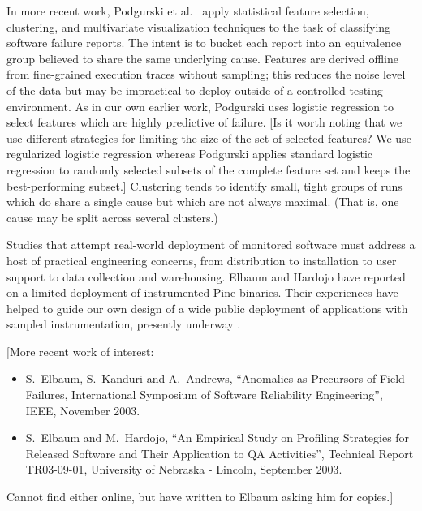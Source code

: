 \documentclass{acm_proc_article-sp}
\newcommand{\placeholder}[1]{{\color[cmyk]{0,0.61,0.87,0}[#1]}}
\begin{document}
In more recent work, Podgurski et al.\ \cite{ICSE`03*465} apply
statistical feature selection, clustering, and multivariate
visualization techniques to the task of classifying software failure
reports.  The intent is to bucket each report into an equivalence
group believed to share the same underlying cause.  Features are
derived offline from fine-grained execution traces without sampling;
this reduces the noise level of the data but may be impractical to
deploy outside of a controlled testing environment.  As in our own
earlier work, Podgurski uses logistic regression to select features
which are highly predictive of failure.  \placeholder{Is it worth
  noting that we use different strategies for limiting the size of the
  set of selected features?  We use regularized logistic regression
  whereas Podgurski applies standard logistic regression to randomly
  selected subsets of the complete feature set and keeps the
  best-performing subset.}  Clustering tends to identify small, tight
groups of runs which do share a single cause but which are not always
maximal.  (That is, one cause may be split across several clusters.)

Studies that attempt real-world deployment of monitored software must
address a host of practical engineering concerns, from distribution to
installation to user support to data collection and warehousing.
Elbaum and Hardojo \cite{Elbaum:2003:DISATA} have reported on a
limited deployment of instrumented Pine binaries.  Their experiences
have helped to guide our own design of a wide public deployment of
applications with sampled instrumentation, presently underway
\cite{Liblit:2003:CBIP}.

\placeholder{More recent work of interest:

  \begin{itemize}
  \item S.\ Elbaum, S.\ Kanduri and A.\ Andrews, ``Anomalies as
    Precursors of Field Failures, International Symposium of Software
    Reliability Engineering'', IEEE, November 2003.
    
  \item S.\ Elbaum and M.\ Hardojo, ``An Empirical Study on Profiling
    Strategies for Released Software and Their Application to QA
    Activities'', Technical Report TR03-09-01, University of Nebraska
    - Lincoln, September 2003.
  \end{itemize}
  
  Cannot find either online, but have written to Elbaum asking him for
  copies.}
\end{document}
